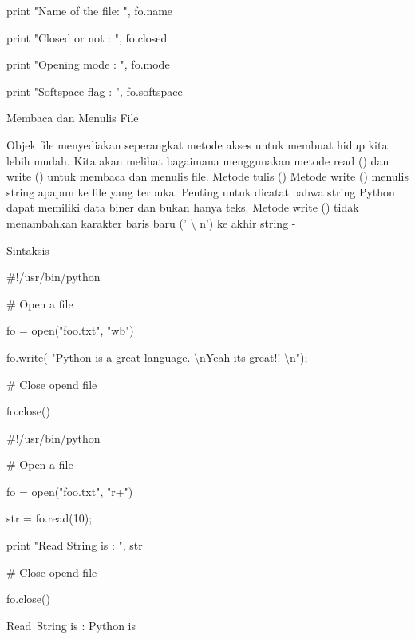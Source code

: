 \noindent 
print "Name of the file: ", fo.name \par
\noindent 
print "Closed or not : ", fo.closed \par
\noindent 
print "Opening mode : ", fo.mode \par
\noindent 
print "Softspace flag : ", fo.softspace \par
\vspace{12pt}
\noindent 
Membaca dan Menulis File \par
\vspace{12pt}
Objek file menyediakan seperangkat metode akses untuk membuat hidup kita lebih mudah. Kita akan melihat bagaimana menggunakan metode read () dan write () untuk membaca dan menulis file. Metode tulis () Metode write () menulis string apapun ke file yang terbuka. Penting untuk dicatat bahwa string Python dapat memiliki data biner dan bukan hanya teks. Metode write () tidak menambahkan karakter baris baru (' $  \setminus  $ n') ke akhir string - \par
\noindent 
Sintaksis \par
\vspace{12pt}
\noindent 
$  \#  $!/usr/bin/python \par
\vspace{12pt}
\noindent 
$  \#  $ Open a file \par
\noindent 
fo = open("foo.txt", "wb") \par
\noindent 
fo.write( "Python is a great language. $  \setminus  $nYeah its great!! $  \setminus  $n"); \par
\vspace{12pt}
\noindent 
$  \#  $ Close opend file \par
\noindent 
fo.close() \par
\noindent 
$  \#  $!/usr/bin/python \par
\vspace{12pt}
\noindent 
$  \#  $ Open a file \par
\noindent 
fo = open("foo.txt", "r+") \par
\noindent 
str = fo.read(10); \par
\noindent 
print "Read String is : ", str \par
\vspace{12pt}
\noindent 
$  \#  $ Close opend file \par
\noindent 
fo.close() \par
\vspace{12pt}
\noindent 
Read~String is :  Python is \par
